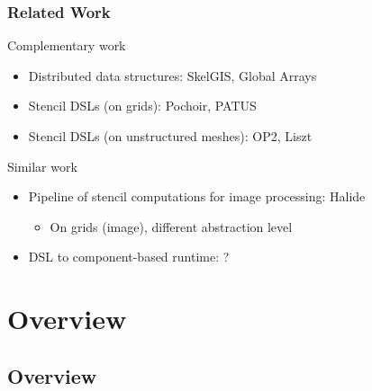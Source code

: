 \documentclass{beamer}
\begin{document}
\begin{frame}
\frametitle{Related Work}
\begin{block}{Complementary work}
\begin{itemize}
\item Distributed data structures: SkelGIS, Global Arrays
\item Stencil DSLs (on grids): Pochoir, PATUS
\item Stencil DSLs (on unstructured meshes): OP2, Liszt
\end{itemize}
\end{block}
\begin{alertblock}{Similar work}
\begin{itemize}
\item Pipeline of stencil computations for image processing: Halide
\begin{itemize}
\item On grids (image), different abstraction level
\end{itemize}
\item DSL to component-based runtime: ?
\end{itemize}
\end{alertblock}
\end{frame}

\section{Overview}
\subsection{Overview}
\end{document}

